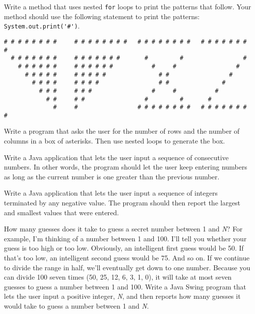 \begin{EXRtwo}
\item  Write a method that uses nested {\tt for} loops to print the 
patterns that follow. Your method should use the following statement
to print the patterns: \verb|System.out.print('#')|.

\begin{jjjlisting}
\begin{lstlisting}[basicstyle=\scriptsize]
# # # # # # # #     # # # # # # # #   # # # # # # # #   # # # # # # # #
  # # # # # # #     # # # # # # #       #         #                 #
    # # # # # #     # # # # # #           #     #                 #
      # # # # #     # # # # #               # #                 #
        # # # #     # # # #                 # #               #
          # # #     # # #                 #     #           #
            # #     # #                 #         #       #
              #     #                 # # # # # # # #   # # # # # # # #
\end{lstlisting}
\end{jjjlisting}

\item  Write a program that asks the user for the number
of rows and the number of columns in a box of asterisks. Then
use nested loops to generate the box.

\item  Write a Java application that lets the user input a sequence
of consecutive numbers. In other words, the program should let the
user keep entering numbers as long as the current number is one
greater than the previous number.

\item  Write a Java application that lets the user input
a sequence of integers terminated by any negative value. The
program should then report the largest and smallest values
that were entered.

\item How many guesses does it take to guess a secret number between 1
and {\it N}? For example, I'm thinking of a number between 1 and
100. I'll tell you whether your guess is too high or too
low. Obviously, an intelligent first guess would be 50. If that's too
low, an intelligent second guess would be 75.  And so on. If we
continue to divide the range in half, we'll eventually get down to one
number. Because you can divide 100 seven times (50, 25, 12, 6, 3, 1,
0), it will take at most seven guesses to guess a number between 1 and
100. Write a Java Swing program that lets the user input a positive integer,
{\it N}, and then reports how many guesses it would take to guess a
number between 1 and {\it N}.


\end{EXRtwo}
